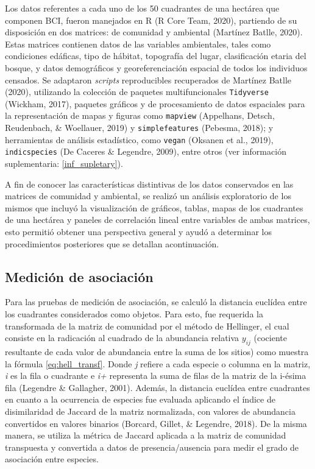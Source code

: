 \documentclass[11pt,]{article}
\begin{document}
Los datos referentes a cada uno de los 50 cuadrantes de una hectárea que
componen BCI, fueron manejados en R (R Core Team, 2020), partiendo de su
disposición en dos matrices: de comunidad y ambiental (Martínez Batlle,
2020). Estas matrices contienen datos de las variables ambientales,
tales como condiciones edáficas, tipo de hábitat, topografía del lugar,
clasificación etaria del bosque, y datos demográficos y
georeferenciación espacial de todos los individuos censados. Se
adaptaron \emph{scripts} reproducibles recuperados de Martínez Batlle
(2020), utilizando la colección de paquetes multifuncionales
\texttt{Tidyverse} (Wickham, 2017), paquetes gráficos y de procesamiento
de datos espaciales para la representación de mapas y figuras como
\texttt{mapview} (Appelhans, Detsch, Reudenbach, \& Woellauer, 2019) y
\texttt{simplefeatures} (Pebesma, 2018); y herramientas de análisis
estadístico, como \texttt{vegan} (Oksanen et al., 2019),
\texttt{indicspecies} (De Caceres \& Legendre, 2009), entre otros (ver
información suplementaria: \ref{inf_supletary}).

A fin de conocer las características distintivas de los datos
conservados en las matrices de comunidad y ambiental, se realizó un
análisis exploratorio de los mismos que incluyó la visualización de
gráficos, tablas, mapas de los cuadrantes de una hectárea y paneles de
correlación lineal entre variables de ambas matrices, esto permitió
obtener una perspectiva general y ayudó a determinar los procedimientos
posteriores que se detallan acontinuación.

\subsection{Medición de asociación}\label{mediciuxf3n-de-asociaciuxf3n}

Para las pruebas de medición de asociación, se calculó la distancia
euclídea entre los cuadrantes considerados como objetos. Para esto, fue
requerida la transformada de la matriz de comunidad por el método de
Hellinger, el cual consiste en la radicación al cuadrado de la
abundancia relativa \(y_{ij}\) (cociente resultante de cada valor de
abundancia entre la suma de los sitios) como muestra la fórmula
\ref{eq:hell_transf}. Donde \emph{j} refiere a cada especie o columna en
la matriz, \emph{i} es la fila o cuadrante e \emph{i+} representa la
suma de filas de la matriz de la i-ésima fila (Legendre \& Gallagher,
2001). Además, la distancia euclídea entre cuadrantes en cuanto a la
ocurrencia de especies fue evaluada aplicando el índice de disimilaridad
de Jaccard de la matriz normalizada, con valores de abundancia
convertidos en valores binarios (Borcard, Gillet, \& Legendre, 2018). De
la misma manera, se utiliza la métrica de Jaccard aplicada a la matriz
de comunidad transpuesta y convertida a datos de presencia/ausencia para
medir el grado de asociación entre especies.
\end{document}
